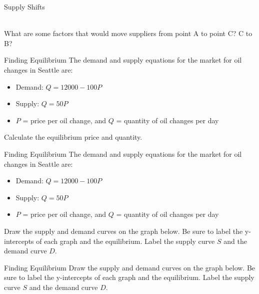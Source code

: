 \documentclass{beamer}
\begin{document}
\begin{frame}[t]{Supply Shifts}
     \\
    What are some factors that would move suppliers from point A to point C? C to B?
\end{frame}

\begin{frame}[t]{Finding Equilibrium}
    The demand and supply equations for the market for oil changes in Seattle are:
    \begin{itemize}
        \item Demand: $Q=12000 - 100P$
        \item Supply: $Q=50P$
        \item $P$ = price per oil change, and $Q$ = quantity of oil changes per day
    \end{itemize}
    Calculate the equilibrium price and quantity.
\end{frame}

\begin{frame}[t]{Finding Equilibrium}
    The demand and supply equations for the market for oil changes in Seattle are:
    \begin{itemize}
        \item Demand: $Q=12000 - 100P$
        \item Supply: $Q=50P$
        \item $P$ = price per oil change, and $Q$ = quantity of oil changes per day
    \end{itemize}
    Draw the supply and demand curves on the graph below. Be sure to label the y-intercepts of each graph and the equilibrium. Label the supply curve $S$ and the demand curve $D$.
\end{frame}

\begin{frame}[t]{Finding Equilibrium}
    Draw the supply and demand curves on the graph below. Be sure to label the y-intercepts of each graph and the equilibrium. Label the supply curve $S$ and the demand curve $D$.
\end{frame}
\end{document}
